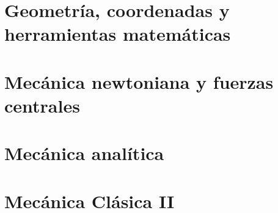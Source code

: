 \documentclass[12pt,openany]{book}
\begin{document}
\frontmatter

\tableofcontents
\mainmatter




\part{Geometría, coordenadas y herramientas matemáticas}









\part{Mecánica newtoniana y fuerzas centrales}




\part{Mecánica analítica}








\part{Mecánica Clásica II}


\end{document}
